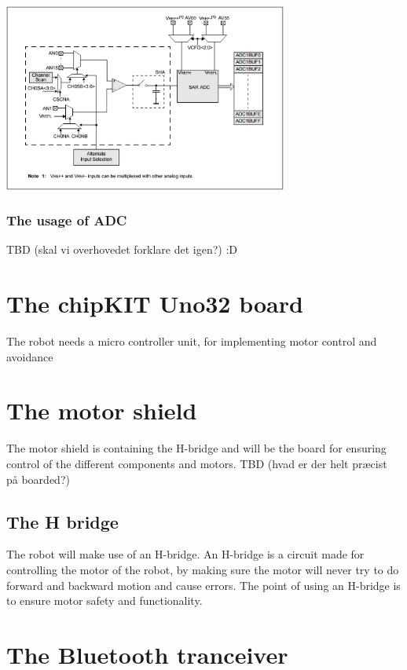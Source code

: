 \includegraphics[width=0.7\textwidth]{figures/adcblock.PNG}


\subsubsection{The usage of ADC}
TBD (skal vi overhovedet forklare det igen?) :D
\section{The chipKIT Uno32 board}
The robot needs a micro controller unit, for implementing motor control and avoidance 

\section{The motor shield}
The motor shield is containing the H-bridge and will be the board for ensuring control of the different components and motors.
TBD (hvad er der helt præcist på boarded?)

\subsection{The H bridge}
The robot will make use of an H-bridge. An H-bridge is a circuit made for controlling the motor of the robot, by making sure the motor will never try to do forward and backward motion  and cause errors. The point of using an H-bridge is to ensure motor safety and functionality.

\section{The Bluetooth tranceiver}

